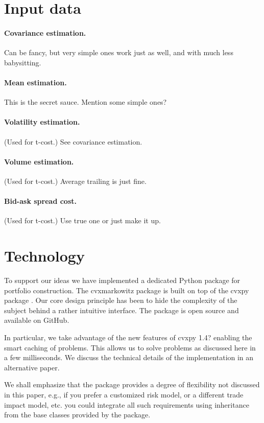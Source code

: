 \documentclass[12pt]{article}
\begin{document}
\section{Input data}

\paragraph{Covariance estimation.}  Can be fancy, but very simple ones work just as well, 
and with much less babysitting.

\paragraph{Mean estimation.}  This is the secret sauce. Mention some simple ones?

\paragraph{Volatility estimation.}  (Used for t-cost.) See covariance estimation.

\paragraph{Volume estimation.}  (Used for t-cost.)  Average trailing is just fine.

\paragraph{Bid-ask spread cost.}  (Used for t-cost.) Use true one or just make it up.

\section{Technology}

To support our ideas we have implemented a dedicated Python package
for portfolio construction. The cvxmarkowitz package is built on top of the cvxpy package \cite{cvxpy}.
Our core design principle has been to hide the complexity of the subject behind
a rather intuitive interface. The package is open source and available on GitHub.

In particular, we take advantage of the new features of cvxpy 1.4?  enabling the smart
caching of problems. This allows us to solve problems as discussed here in a few milliseconds.
We discuss the technical details of the implementation in an alternative paper.

We shall emphasize that the package provides a degree of flexibility not discussed in this paper,
e.g., if you prefer a customized risk model, or a different trade impact model, etc. you
could integrate all such requirements using inheritance from the base classes provided by the package.
\end{document}
